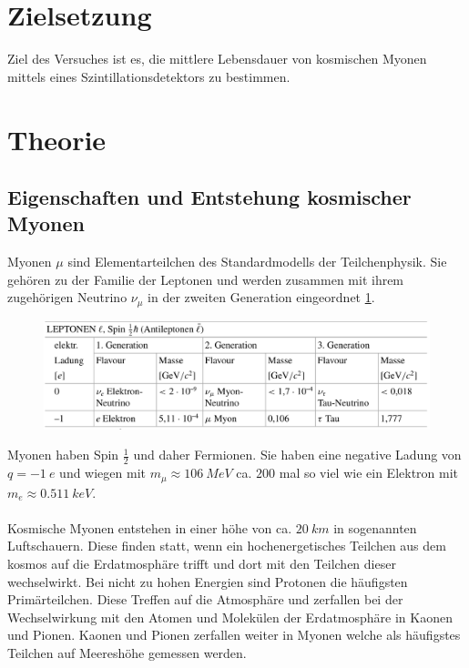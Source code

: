 \section{Zielsetzung}
\label{sec:Zielsetzung}
Ziel des Versuches ist es, die mittlere Lebensdauer von kosmischen Myonen mittels eines Szintillationsdetektors zu bestimmen. 

\section{Theorie}
\label{sec:Theorie}
\subsection{Eigenschaften und Entstehung kosmischer Myonen}
Myonen $\mu$ sind Elementarteilchen des Standardmodells der Teilchenphysik. Sie gehören zu der Familie der Leptonen und werden zusammen mit ihrem zugehörigen Neutrino $\nu_\mu$ in der zweiten Generation eingeordnet \ref{fig:std}.
\begin{figure}[H]
    \centering
    \includegraphics[width=\linewidth]{data/leptonen_std.png}
    \label{fig:std}
\end{figure}
\noindent
Myonen haben Spin $\frac{1}{2}$ und daher Fermionen. Sie haben eine negative Ladung von $q = \SI{-1}{e}$ und wiegen mit $m_\mu \approx \SI{106}{MeV}$ ca. $200$ mal so viel wie ein Elektron mit $m_e \approx \SI{0.511}{keV}$.
\\
\\
Kosmische Myonen entstehen in einer höhe von ca. $\SI{20}{km}$ in sogenannten Luftschauern. Diese finden statt, wenn ein hochenergetisches Teilchen aus dem kosmos auf die Erdatmosphäre trifft und dort mit den Teilchen dieser wechselwirkt.
Bei nicht zu hohen Energien sind Protonen die häufigsten Primärteilchen. Diese Treffen auf die Atmosphäre und zerfallen bei der Wechselwirkung mit den Atomen und Molekülen der Erdatmosphäre in Kaonen und Pionen. Kaonen und Pionen zerfallen weiter in Myonen welche als häufigstes Teilchen auf Meereshöhe gemessen werden.
